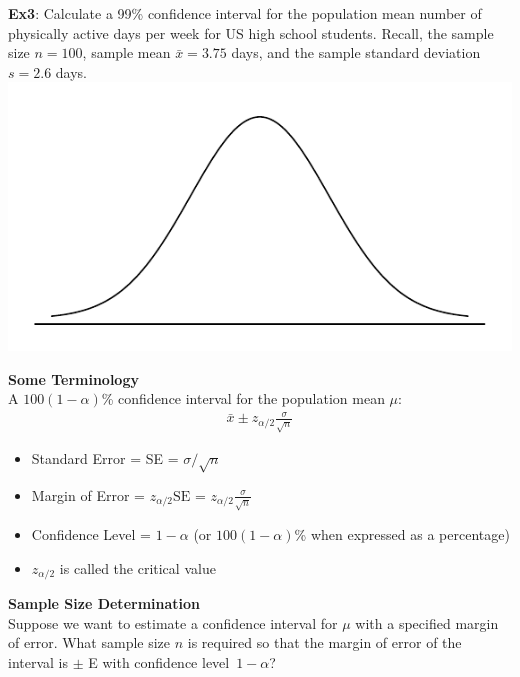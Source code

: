 \documentclass[fleqn, 11pt]{article}\usepackage[]{graphicx}\usepackage[]{color}
\begin{document}
\textbf{Ex3}: Calculate a 99\% confidence interval for the population mean number of physically active days per week for US high school students.  Recall,  the sample size $n=100$, sample mean $\bar{x} = 3.75$ days, and the sample standard deviation $s=2.6$ days.\\ 
\includegraphics[scale=0.6]{norm_draw.pdf}
\vspace{2.5cm}

\textbf{Some Terminology}\\
A $100(1-\alpha)$\% confidence interval for the population mean $\mu$:
\begin{align*}
\bar{x} \pm z_{\alpha/2} \frac{\sigma}{\sqrt{n}}
\end{align*}
\begin{itemize}
\item Standard Error = SE = $\sigma/\sqrt{n}$ 
\item Margin of Error = $z_{\alpha/2} \text{SE}$ = $z_{\alpha/2} \frac{\sigma}{\sqrt{n}}$
\item Confidence Level = $1-\alpha$ (or $100(1-\alpha)$\% when expressed as a percentage)
\item $z_{\alpha/2}$ is called the critical value\\
\end{itemize}

\smallskip
\textbf{Sample Size Determination}\\
Suppose we want to estimate a confidence interval for $\mu$ with a specified margin of error.  What sample size $n$ is required so that the margin of error of the interval is $\pm$ E with confidence level~$1-\alpha$?\\
\end{document}
